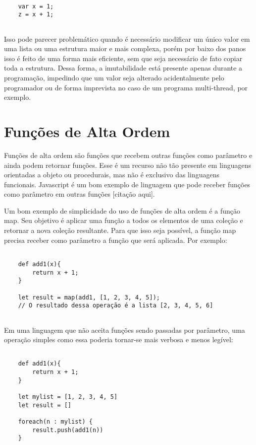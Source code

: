 \begin{lstlisting}[caption={Exemplo de Código Imutável},label=imutablevar]

    var x = 1;
    z = x + 1;


\end{lstlisting}

Isso pode parecer problemático quando é necessário 
modificar um único valor em uma lista ou uma estrutura 
maior e mais complexa, porém por baixo dos panos isso 
é feito de uma forma mais eficiente, sem que seja 
necessário de fato copiar toda a estrutura. Dessa forma, 
a imutabilidade está presente apenas durante a 
programação, impedindo que um valor seja alterado 
acidentalmente pelo programador ou de forma imprevista 
no caso de um programa multi-thread, por exemplo.


\section{Funções de Alta Ordem}

Funções de alta ordem são funções que recebem 
outras funções como parâmetro e ainda podem 
retornar funções. Esse é um recurso 
não tão presente em linguagens orientadas a 
objeto ou procedurais, mas não é exclusivo das 
linguagens funcionais. Javascript é um bom 
exemplo de linguagem que pode receber funções 
como parâmetro em outras funções [citação aqui].

Um bom exemplo de simplicidade do uso de 
funções de alta ordem é a função map. Seu objetivo 
é aplicar uma função a todos os elementos de uma 
coleção e retornar a nova coleção resultante. 
Para que isso seja possível, a função map precisa 
receber como parâmetro a função que será aplicada. 
Por exemplo:

\begin{lstlisting}[caption={Exemplo de Função de Alta Ordem},label=hof]

    def add1(x){
        return x + 1;
    }

    let result = map(add1, [1, 2, 3, 4, 5]);
    // O resultado dessa operação é a lista [2, 3, 4, 5, 6]
        

\end{lstlisting}

Em uma linguagem que não aceita funções sendo 
passadas por parâmetro, uma operação simples como 
essa poderia tornar-se mais verbosa e menos legível:

\begin{lstlisting}[caption={Exemplo sem Funções de Alta Ordem},label=nohof]

    def add1(x){
        return x + 1;
    }

    let mylist = [1, 2, 3, 4, 5]
    let result = []

    foreach(n : mylist) {
        result.push(add1(n))
    }

\end{lstlisting}

